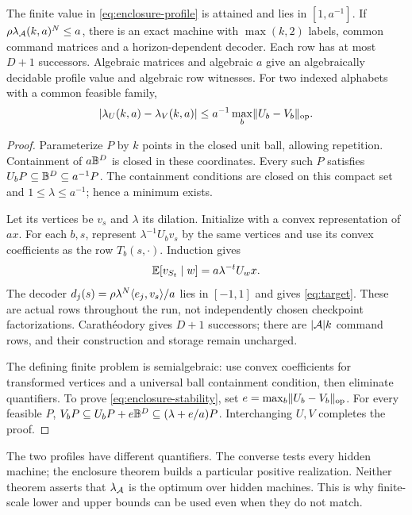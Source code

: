 \begin{theorem}\label{thm:enclosure}
The finite value in \eqref{eq:enclosure-profile} is attained and lies in $[1,a^{-1}]$. If $\rho\lambda_{\mathcal A}(k,a)^N\le a$, there is an exact machine with $\max(k,2)$ labels, common command matrices and a horizon-dependent decoder. Each row has at most $D+1$ successors. Algebraic matrices and algebraic $a$ give an algebraically decidable profile value and algebraic row witnesses. For two indexed alphabets with a common feasible family,
\begin{equation}\label{eq:enclosure-stability}
 |\lambda_U(k,a)-\lambda_V(k,a)|
                \le a^{-1}\max_b\lVert U_b-V_b\rVert_{\mathrm{op}}.
\end{equation}
\end{theorem}
\begin{proof}
Parameterize $P$ by $k$ points in the closed unit ball, allowing repetition. Containment of $a\mathbb B^D$ is closed in these coordinates. Every such $P$ satisfies $U_bP\subseteq\mathbb B^D\subseteq a^{-1}P$. The containment conditions are closed on this compact set and $1\le\lambda\le a^{-1}$; hence a minimum exists.

Let its vertices be $v_s$ and $\lambda$ its dilation. Initialize with a convex representation of $ax$. For each $b,s$, represent $\lambda^{-1}U_bv_s$ by the same vertices and use its convex coefficients as the row $T_b(s,\cdot)$. Induction gives
\[
                   \mathbb E[v_{S_t}\mid w]=a\lambda^{-t}U_wx.
\]
The decoder $d_j(s)=\rho\lambda^N\langle e_j,v_s\rangle/a$ lies in $[-1,1]$ and gives \eqref{eq:target}. These are actual rows throughout the run, not independently chosen checkpoint factorizations. Carath\'eodory gives $D+1$ successors; there are $|\mathcal A|k$ command rows, and their construction and storage remain uncharged.

The defining finite problem is semialgebraic: use convex coefficients for transformed vertices and a universal ball containment condition, then eliminate quantifiers. To prove \eqref{eq:enclosure-stability}, set $e=\max_b\lVert U_b-V_b\rVert_{\mathrm{op}}$. For every feasible $P$,
$V_bP\subseteq U_bP+e\mathbb B^D\subseteq(\lambda+e/a)P$.
Interchanging $U,V$ completes the proof.
\end{proof}

The two profiles have different quantifiers. The converse tests every hidden machine; the enclosure theorem builds a particular positive realization. Neither theorem asserts that $\lambda_{\mathcal A}$ is the optimum over hidden machines. This is why finite-scale lower and upper bounds can be used even when they do not match.

